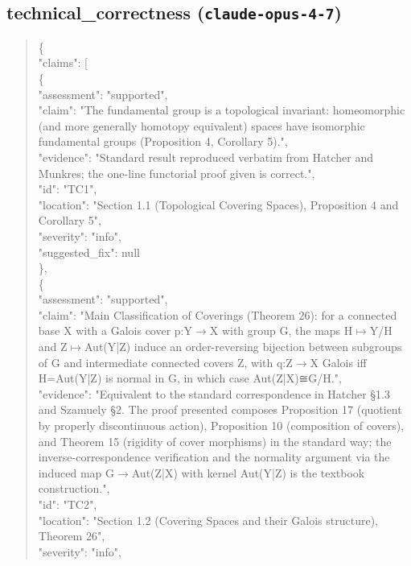 \documentclass[11pt]{article}
\begin{document}
\subsection*{technical\_correctness (\texttt{claude-opus-4-7})}
\begin{quote}\small\ttfamily\raggedright
\{\\
  "claims": [\\
    \{\\
      "assessment": "supported",\\
      "claim": "The fundamental group is a topological invariant: homeomorphic (and more generally homotopy equivalent) spaces have isomorphic fundamental groups (Proposition 4, Corollary 5).",\\
      "evidence": "Standard result reproduced verbatim from Hatcher and Munkres; the one-line functorial proof given is correct.",\\
      "id": "TC1",\\
      "location": "Section 1.1 (Topological Covering Spaces), Proposition 4 and Corollary 5",\\
      "severity": "info",\\
      "suggested\_fix": null\\
    \},\\
    \{\\
      "assessment": "supported",\\
      "claim": "Main Classification of Coverings (Theorem 26): for a connected base X with a Galois cover p:Y\ensuremath{\to}X with group G, the maps H\ensuremath{\mapsto}Y/H and Z\ensuremath{\mapsto}Aut(Y|Z) induce an order-reversing bijection between subgroups of G and intermediate connected covers Z, with q:Z\ensuremath{\to}X Galois iff H=Aut(Y|Z) is normal in G, in which case Aut(Z|X)≅G/H.",\\
      "evidence": "Equivalent to the standard correspondence in Hatcher §1.3 and Szamuely §2. The proof presented composes Proposition 17 (quotient by properly discontinuous action), Proposition 10 (composition of covers), and Theorem 15 (rigidity of cover morphisms) in the standard way; the inverse-correspondence verification and the normality argument via the induced map G\ensuremath{\to}Aut(Z|X) with kernel Aut(Y|Z) is the textbook construction.",\\
      "id": "TC2",\\
      "location": "Section 1.2 (Covering Spaces and their Galois structure), Theorem 26",\\
      "severity": "info",\\

\end{quote}
\end{document}
